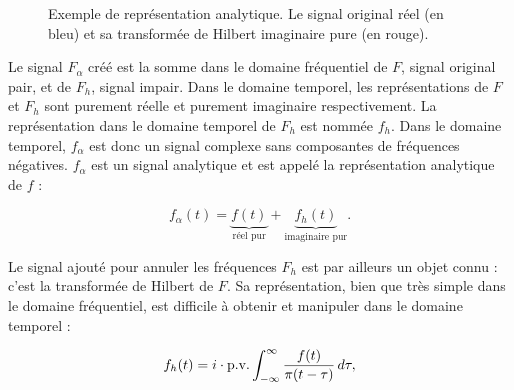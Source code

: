 \begin{figure}[h]
    \centering

    \caption[Signal analytique pour un signal complexe]{Exemple de représentation analytique. Le signal original réel (en bleu) et sa transformée de Hilbert imaginaire pure (en rouge).}
    \label{fig:analytic-representation}
\end{figure}

Le signal $F_{\alpha}$ créé est la somme dans le domaine fréquentiel de $F$, signal original pair, et de $F_h$, signal impair. Dans le domaine temporel, les représentations de $F$
et $F_h$ sont purement réelle et purement imaginaire respectivement. La représentation dans le domaine temporel de $F_h$ est nommée $f_h$. Dans le domaine temporel, $f_{\alpha}$ est donc un signal complexe sans composantes de fréquences négatives. $f_\alpha$ est un signal analytique et est appelé la \og représentation analytique \fg de $f$ :

\begin{equation}
    f_{\alpha}(t) = \underbrace{f(t)}_\text{réel pur} + \underbrace{f_h(t)}_\text{imaginaire pur}.
\end{equation}

Le signal ajouté pour annuler les fréquences $F_h$ est par ailleurs un objet connu : c'est la transformée de Hilbert de $F$. Sa représentation, bien que très simple dans le domaine fréquentiel, est difficile à obtenir et manipuler dans le domaine temporel :

\begin{equation}
    f_h(t) = i \cdot \textnormal{p.v.} \int_{-\infty}^{\infty} \frac{f(t)}{\pi(t-\tau)} \,d\tau,
\end{equation}

